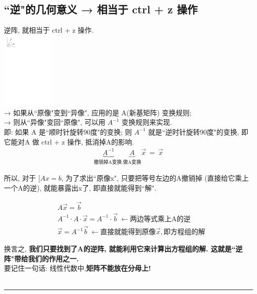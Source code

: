 \documentclass[UTF8]{ctexart}
\begin{document}
\subsection{``逆"的几何意义 → 相当于 ctrl + z 操作}

逆阵, 就相当于 ctrl + z 操作.\\

\includegraphics[width=0.2\textwidth]{img/0048.pdf}\\

→ 如果从``原像"变到``异像", 应用的是 A(新基矩阵) 变换规则; \\
→ 则从``异像"变回``原像", 可以用 $ A^{-1}$ 变换规则来实现.\\

即: 如果 A 是``顺时针旋转90度"的变换; 则  $ A^{-1}$ 就是``逆时针旋转90度"的变换, 即它能对A 做 ctrl + z 操作, 抵消掉A的影响.\\

\begin{align*}
	\underset{\text{撤销掉A变换.}}  {\underbrace{A^{-1}}}\underset{\text{做A变换}}{\underbrace{A}}\overrightarrow{x}\ =\ \overrightarrow{x}
\end{align*}

所以, 对于 $[ Ax=b$, 为了求出``原像x", 只要把等号左边的A撤销掉 (直接给它乘上一个A的逆), 就能暴露出x了, 即直接就能得到``解".

\begin{align*}
	& A\vec{x} = \vec{b} \\
	& A^{-1} \cdot A \cdot \vec{x} = A^{-1} \cdot \vec{b} \ ← \text{两边等式乘上A的逆}\\
	& \vec{x} = A^{-1}  \vec{b} \ ← \text{直接就能得到原像}\vec{x}, 即方程组的解
\end{align*}

换言之, \textbf{我们只要找到了A的逆阵, 就能利用它来计算出方程组的解. 这就是``逆阵"带给我们的作用之一. }\\

要记住一句话: 线性代数中,\textbf{矩阵不能放在分母上!} \\


~\\
\hrule
~\\
\end{document}
